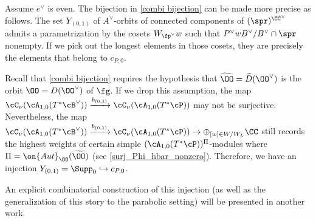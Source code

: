 \documentclass[12pt]{amsart}
\begin{document}
\begin{rmk}
    

    Assume $e^\vee$ is even. The bijection in \cref{combi bijection} can be made more precise as follows. The set $Y_{(0,1)}$ of $A^\vee$-orbits of connected components of $(\spr)^{\CC^\times}$ admits a parametrization by the cosets $W_{\fp^\vee} w$ such that $P^{\vee}wB^\vee/B^\vee\cap \spr$ nonempty. If we pick out the longest elements in those cosets, they are precisely the elements that belong to $c_{P,0}$. 

    Recall that \cref{combi bijection} requires the hypothesis that $\widetilde{\OO}= \widetilde{D}(\OO^\vee)$ is the orbit $\OO= D(\OO^\vee)$ of $\fg$. If we drop this assumption, the map $\cC_\nu(\cA_{1,0}(T^*\cB^\vee))\xrightarrow{b_{(0,1)}} \cC_\nu(\cA_{1,0}(T^*\cP))$ may not be surjective. Nevertheless, the map  $\cC_\nu(\cA_{1,0}(T^*\cB^\vee))\xrightarrow{b_{(0,1)}} \cC_\nu(\cA_{1,0}(T^*\cP))\rightarrow \oplus_{[w]\in W/W_{L}}\CC$ still records the highest weights of certain simple $(\cA_{1,0}(T^*\cP))^\Pi$-modules where $\Pi=\on{Aut}_\OO(\widetilde{\OO})$ (see \cref{surj_Phi_hbar_nonzero}). Therefore, we have an injection $Y_{(0,1)}= \Supp_0\hookrightarrow c_{P,0}$. 
    
    An explicit combinatorial construction of this injection (as well as the generalization of this story to the parabolic setting) will be presented in another work.%
\end{rmk}
\end{document}
